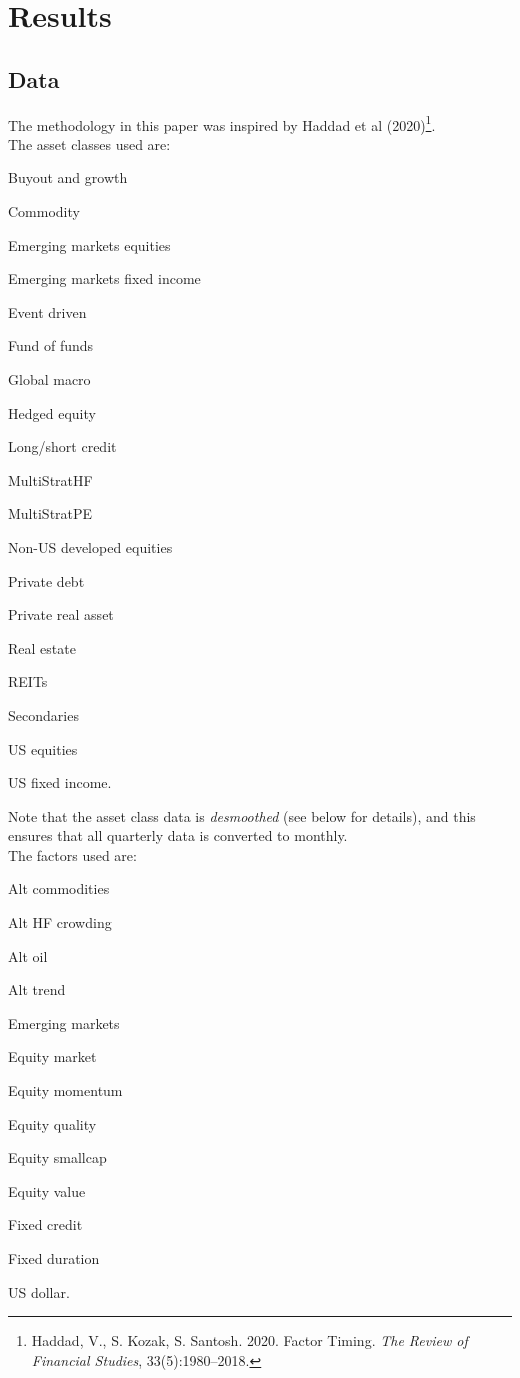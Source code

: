 \documentclass{ledger}
\begin{document}
\section{Results}

\subsection{Data}
%
The methodology in this paper was inspired by Haddad et al (2020)\footnote{Haddad, V., S. Kozak, S. Santosh. 2020. Factor Timing. \textit{The Review of Financial Studies}, 33(5):1980–2018.}.  \\

The asset classes used are:
\begin{inparaenum}[(i)]
    \item Buyout and growth
    \item Commodity
    \item Emerging markets equities
    \item Emerging markets fixed income
    \item Event driven
    \item Fund of funds
    \item Global macro
    \item Hedged equity
    \item Long/short credit
    \item MultiStratHF
    \item MultiStratPE
    \item Non-US developed equities
    \item Private debt
    \item Private real asset
    \item Real estate
    \item REITs
    \item Secondaries
    \item US equities
    \item US fixed income. 
\end{inparaenum} Note that the asset class data is \textit{desmoothed} (see below for details), and this ensures that all quarterly data is converted to monthly. \\

The factors used are:
\begin{inparaenum}[(i)]
    \item Alt commodities
    \item Alt HF crowding
    \item Alt oil
    \item Alt trend
    \item Emerging markets
    \item Equity market
    \item Equity momentum
    \item Equity quality
    \item Equity smallcap
    \item Equity value
    \item Fixed credit
    \item Fixed duration
    \item US dollar. \\
\end{inparaenum}
\end{document}
